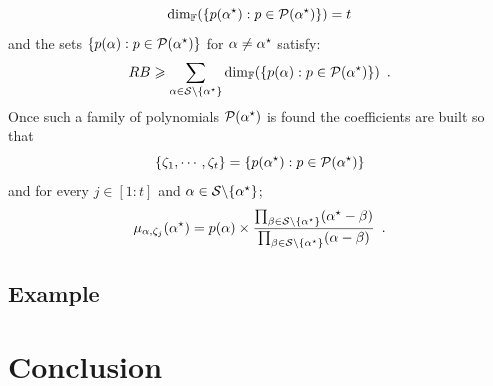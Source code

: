 \documentclass{llncs}
\begin{document}
$$
\dim_{\mathbb{F}} (\{p(\alpha^{\star}): p\in \mathcal{P}(\alpha^{\star})\}) = t
$$
and the sets $\{p(\alpha): p\in \mathcal{P}(\alpha^{\star})\}$ for $\alpha \neq \alpha^{\star}$ satisfy:
$$
RB \geqslant \sum_{\alpha \in \mathcal{S} \backslash \{\alpha^{\star}\}} \dim_{\mathbb{F}} (\{p(\alpha): p\in \mathcal{P}(\alpha^{\star})\}) \enspace .
$$
Once such a family of polynomials $\mathcal{P}(\alpha^{\star})$ is found the coefficients are built so that
$$
\{\zeta_1,\cdots,\zeta_t\} = \{p(\alpha^{\star}): p\in \mathcal{P}(\alpha^{\star})\}
$$
and for every $j\in [1:t]$ and $\alpha \in \mathcal{S} \backslash \{\alpha^{\star}\}$;
$$
\mu_{\alpha,\zeta_j}(\alpha^{\star}) = p(\alpha)\times \frac{\prod_{\beta\in \mathcal{S} \backslash \{\alpha^{\star}\}}(\alpha^{\star} - \beta)}{\prod_{\beta\in \mathcal{S} \backslash \{\alpha^{\star}\}}(\alpha - \beta)} \enspace .
$$

 
\subsection{Example}


\section{Conclusion}
\label{sec-conc}
 \todo{}
 
%
%



\printbibliography
\end{document}
